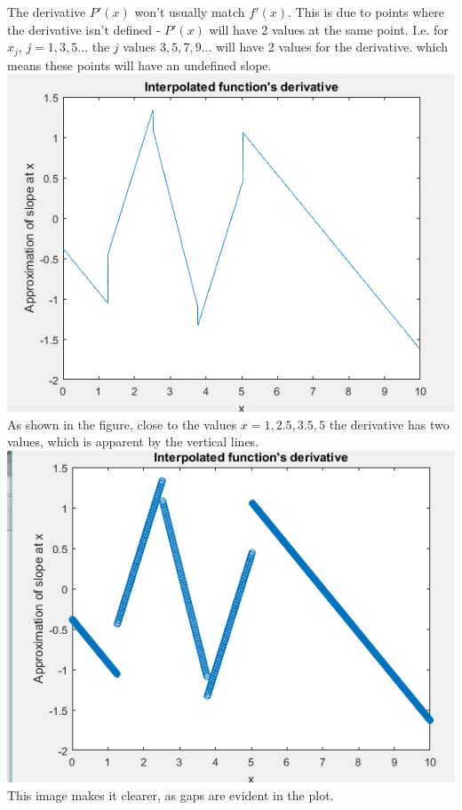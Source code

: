 \documentclass[a4paper]{article}
\begin{document}
	The derivative $P'(x)$ won't usually match $f'(x)$. This is due to points where the derivative isn't defined - $P'(x)$ will have 2 values at the same point. I.e. for $x_j$, $j=1,3,5...$ the $j$ values $3,5,7,9...$ will have 2 values for the derivative. which means these points will have an undefined slope.
	\includegraphics{plotderivative.PNG}
	As shown in the figure, close to the values $x=1,2.5,3.5,5$ the derivative has two values, which is apparent by the vertical lines.\\
	\includegraphics{plotderivativeclear.PNG}\\
	This image makes it clearer, as gaps are evident in the plot.
	
\end{document}
